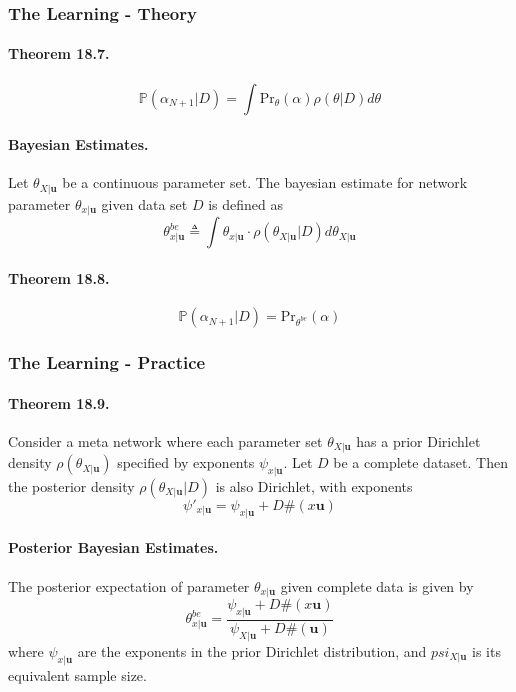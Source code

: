\documentclass[11pt]{article}
\newcommand{\bu}{\mathbf{u}}
\newcommand{\pr}{\mathrm{Pr}}
\begin{document}
\subsubsection{The Learning - Theory}
\paragraph{Theorem 18.7.} 
\begin{equation}
	\mathbb P (\alpha _{N + 1} | D ) = \int \pr_\theta ( \alpha ) \rho ( \theta | D) d \theta
\end{equation}

\paragraph{Bayesian Estimates.} Let $\theta _{X | \bu}$ be a continuous parameter set. The bayesian estimate for network parameter $\theta_{x | \bu}$ given data set $D$ is defined as 
\begin{equation}
	\theta_{x | \bu }^{be} \triangleq \int \theta_{x | \bu} \cdot \rho ( \theta _{X | \bu} | D) d \theta_{X | \bu}
\end{equation}

\paragraph{Theorem 18.8.} 
\begin{equation}
	\mathbb P ( \alpha_{N + 1} | D) = \pr_{\theta^{be}} (\alpha)
\end{equation}

\subsubsection{The Learning - Practice}
\paragraph{Theorem 18.9.} 
Consider a meta network where each parameter set $\theta_{X| \bu}$ has a prior Dirichlet density $\rho ( \theta _ {X | \bu} )$ specified by exponents $\psi_{x | \bu} $. Let $D$ be a complete dataset. Then the posterior density $\rho ( \theta _{X| \bu} | D)$ is also Dirichlet, with exponents
\begin{equation}
	\psi ' _{x | \bu} = \psi _{x|\bu} + D \# (x \bu)
\end{equation}

\paragraph{Posterior Bayesian Estimates.} The posterior expectation of parameter $\theta_{x | \bu}$ given complete data is given by
\begin{equation}
	\theta^{be}_{x | \bu} = \frac{\psi_{x |\bu} + D\# (x \bu)}{\psi_{X | \bu} + D \# (\bu) }
\end{equation}
where $\psi_{x |\bu}$ are the exponents in the prior Dirichlet distribution, and $psi_{X |\bu}$ is its equivalent sample size. 
\end{document}
